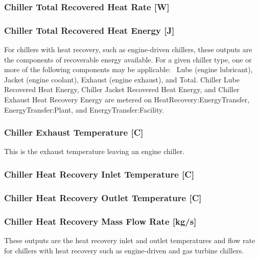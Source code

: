 \subsubsection{Chiller Total Recovered Heat Rate {[}W{]}}\label{chiller-total-recovered-heat-rate-w}

\subsubsection{Chiller Total Recovered Heat Energy {[}J{]}}\label{chiller-total-recovered-heat-energy-j}

For chillers with heat recovery, such as engine-driven chillers, these outputs are the components of recoverable energy available. For a given chiller type, one or more of the following components may be applicable:~ Lube (engine lubricant), Jacket (engine coolant), Exhaust (engine exhaust), and Total. Chiller Lube Recovered Heat Energy, Chiller Jacket Recovered Heat Energy, and Chiller Exhaust Heat Recovery Energy are metered on HeatRecovery:EnergyTransfer, EnergyTransfer:Plant, and EnergyTransfer:Facility.

\subsubsection{Chiller Exhaust Temperature {[}C{]}}\label{chiller-exhaust-temperature-c}

This is the exhaust temperature leaving an engine chiller.

\subsubsection{Chiller Heat Recovery Inlet Temperature {[}C{]}}\label{chiller-heat-recovery-inlet-temperature-c}

\subsubsection{Chiller Heat Recovery Outlet Temperature {[}C{]}}\label{chiller-heat-recovery-outlet-temperature-c}

\subsubsection{Chiller Heat Recovery Mass Flow Rate {[}kg/s{]}}\label{chiller-heat-recovery-mass-flow-rate-kgs}

These outputs are the heat recovery inlet and outlet temperatures and flow rate for chillers with heat recovery such as engine-driven and gas turbine chillers.

